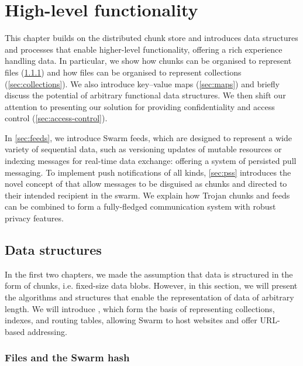 \chapter{High-level functionality}\label{sec:high-level-functionality}


This chapter builds on the distributed chunk store and introduces data structures and processes that enable higher-level functionality, offering a rich experience handling data. In particular, we show how chunks can be organised to represent files (\ref{sec:files}) and how files can be organised to represent collections (\ref{sec:collections}). We also introduce key--value maps (\ref{sec:maps}) and briefly discuss the potential of arbitrary functional data structures. We then shift our attention to presenting our solution for providing confidentiality and access control (\ref{sec:access-control}). 

In \ref{sec:feeds}, we introduce Swarm feeds, which are designed to represent a wide variety of sequential data, such as versioning updates of mutable resources or indexing messages for real-time data exchange: offering a system of persisted pull messaging. To implement push notifications of all kinds, \ref{sec:pss} introduces the novel concept of  that allow messages to be disguised as chunks and directed to their intended recipient in the swarm. We explain how Trojan chunks and feeds can be combined to form a fully-fledged communication system with robust privacy features.



\section{Data structures\statusgreen} \label{sec:datastructures}

\green{}

In the first two chapters, we made the assumption that data is structured in the form of chunks, i.e. fixed-size data blobs. However, in this section, we will present the algorithms and structures that enable the representation of data of arbitrary length. We will introduce , which form the basis of representing collections, indexes, and routing tables, allowing Swarm to host websites and offer URL-based addressing.

\subsection{Files and the Swarm hash\statusgreen}\label{sec:files}

